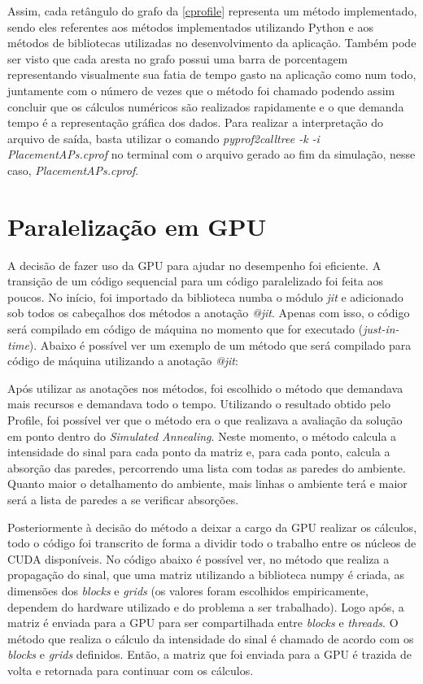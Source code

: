 \documentclass[
	12pt,				%
	openright,			%
	twoside,			%
	a4paper,			%
	english,			%
	french,				%
	spanish,			%
	brazil				%
	]{abntex2}
\begin{document}
Assim, cada retângulo do grafo da \autoref{cprofile} representa um método implementado, sendo eles referentes aos métodos implementados utilizando Python e aos métodos de bibliotecas utilizadas no desenvolvimento da aplicação. Também pode ser visto que cada aresta no grafo possui uma barra de porcentagem representando visualmente sua fatia de tempo gasto na aplicação como num todo, juntamente com o número de vezes que o método foi chamado podendo assim concluir que os cálculos numéricos são realizados rapidamente e o que demanda tempo é a representação gráfica dos dados.  Para realizar a interpretação do arquivo de saída, basta utilizar o comando \textit{pyprof2calltree -k -i PlacementAPs.cprof} no terminal com o arquivo gerado ao fim da simulação, nesse caso, \textit{PlacementAPs.cprof}.

\section[Paralelização em GPU]{Paralelização em GPU}

A decisão de fazer uso da GPU para ajudar no desempenho foi eficiente. A transição de um código sequencial para um código paralelizado foi feita aos poucos. No início, foi importado da biblioteca numba o módulo \textit{jit} e adicionado sob todos os cabeçalhos dos métodos a anotação \textit{@jit}. Apenas com isso, o código será compilado em código de máquina no momento que for executado (\textit{just-in-time}).
Abaixo é possível ver um exemplo de um método que será compilado para código de máquina utilizando a anotação \textit{@jit}:



Após utilizar as anotações nos métodos, foi escolhido o método que demandava mais recursos e demandava todo o tempo. Utilizando o resultado obtido pelo Profile, foi possível ver que o método era o que realizava a avaliação da solução em ponto dentro do \textit{Simulated Annealing}. Neste momento, o método calcula a intensidade do sinal para cada ponto da matriz e, para cada ponto, calcula a absorção das paredes, percorrendo uma lista com todas as paredes do ambiente. Quanto maior o detalhamento do ambiente, mais linhas o ambiente terá e maior será a lista de paredes a se verificar absorções.

Posteriormente à decisão do método a deixar a cargo da GPU realizar os cálculos, todo o código foi transcrito de forma a dividir todo o trabalho entre os núcleos de CUDA disponíveis. No código abaixo é possível ver, no método que realiza a propagação do sinal, que uma matriz utilizando a biblioteca numpy é criada, as dimensões dos \textit{blocks} e \textit{grids} (os valores foram escolhidos empiricamente, dependem do hardware utilizado e do problema a ser trabalhado). Logo após, a matriz é enviada para a GPU para ser compartilhada entre \textit{blocks} e \textit{threads}. O método que realiza o cálculo da intensidade do sinal é chamado de acordo com os \textit{blocks} e \textit{grids} definidos. Então, a matriz que foi enviada para a GPU é trazida de volta e retornada para continuar com os cálculos.
\end{document}
